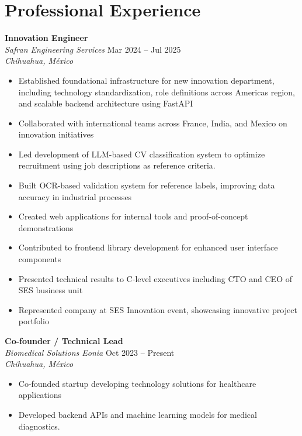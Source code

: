 \section*{Professional Experience}

\textbf{Innovation Engineer} \\
\textit{Safran Engineering Services} \hfill Mar 2024 -- Jul 2025 \\
\textit{Chihuahua, México}

\begin{itemize}
    \item Established foundational infrastructure for new innovation department, including technology standardization, role definitions across Americas region, and scalable backend architecture using FastAPI
    
    \item Collaborated with international teams across France, India, and Mexico on innovation initiatives

    \item Led development of LLM-based CV classification system to optimize recruitment using job descriptions as reference criteria.
    
    \item Built OCR-based validation system for reference labels, improving data accuracy in industrial processes
    
    \item Created web applications for internal tools and proof-of-concept demonstrations
    
    \item Contributed to frontend library development for enhanced user interface components
    
    \item Presented technical results to C-level executives including CTO and CEO of SES business unit
    
    \item Represented company at SES Innovation event, showcasing innovative project portfolio
\end{itemize}

\textbf{Co-founder / Technical Lead} \\
\textit{Biomedical Solutions Eonia} \hfill Oct 2023 -- Present \\
\textit{Chihuahua, México}
\begin{itemize}
    \item Co-founded startup developing technology solutions for healthcare applications
    \item Developed backend APIs and machine learning models for medical diagnostics.
\end{itemize}